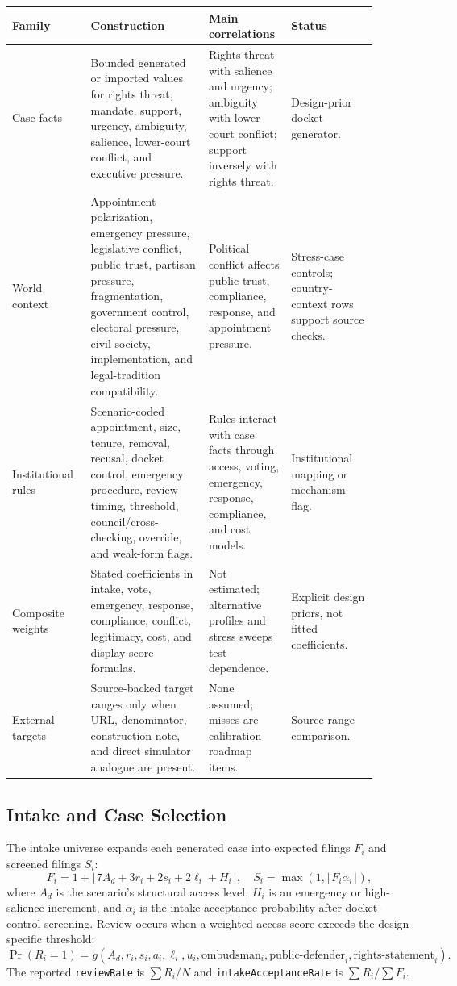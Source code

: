 \begin{center}
\scriptsize
\begin{tabular}{@{}p{0.20\linewidth}p{0.30\linewidth}p{0.18\linewidth}p{0.22\linewidth}@{}}
\toprule
Family & Construction & Main correlations & Status \\
\midrule
Case facts & Bounded generated or imported values for rights threat, mandate, support, urgency, ambiguity, salience, lower-court conflict, and executive pressure. & Rights threat with salience and urgency; ambiguity with lower-court conflict; support inversely with rights threat. & Design-prior docket generator. \\
World context & Appointment polarization, emergency pressure, legislative conflict, public trust, partisan pressure, fragmentation, government control, electoral pressure, civil society, implementation, and legal-tradition compatibility. & Political conflict affects public trust, compliance, response, and appointment pressure. & Stress-case controls; country-context rows support source checks. \\
Institutional rules & Scenario-coded appointment, size, tenure, removal, recusal, docket control, emergency procedure, review timing, threshold, council/cross-checking, override, and weak-form flags. & Rules interact with case facts through access, voting, emergency, response, compliance, and cost models. & Institutional mapping or mechanism flag. \\
Composite weights & Stated coefficients in intake, vote, emergency, response, compliance, conflict, legitimacy, cost, and display-score formulas. & Not estimated; alternative profiles and stress sweeps test dependence. & Explicit design priors, not fitted coefficients. \\
External targets & Source-backed target ranges only when URL, denominator, construction note, and direct simulator analogue are present. & None assumed; misses are calibration roadmap items. & Source-range comparison. \\
\bottomrule
\end{tabular}
\end{center}

\subsection*{Intake and Case Selection}

The intake universe expands each generated case into expected filings $F_i$ and screened filings $S_i$:
\[
F_i = 1 + \lfloor 7A_d + 3r_i + 2s_i + 2\ell_i + H_i \rfloor,
\quad
S_i = \max(1, \lfloor F_i \alpha_i \rfloor),
\]
where $A_d$ is the scenario's structural access level, $H_i$ is an emergency or high-salience increment, and $\alpha_i$ is the intake acceptance probability after docket-control screening. Review occurs when a weighted access score exceeds the design-specific threshold:
\[
\Pr(R_i = 1) = g(A_d, r_i, s_i, a_i, \ell_i, u_i, \text{ombudsman}_i, \text{public-defender}_i, \text{rights-statement}_i).
\]
The reported \texttt{reviewRate} is $\sum R_i/N$ and \texttt{intakeAcceptanceRate} is $\sum R_i/\sum F_i$.

